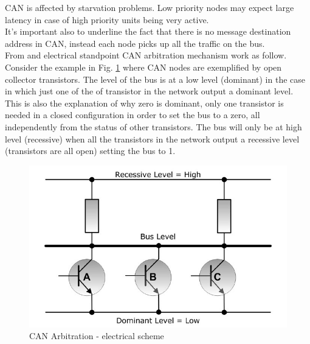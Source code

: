 \documentclass[../main.tex]{subfiles}
\begin{document}
\gls{CAN} is affected by starvation problems. Low priority nodes may expect large latency in case of high priority units being very active. \\
It's important also to underline the fact that there is no message destination address in \gls{CAN}, instead each node picks up all the traffic on the bus.\\
From and electrical standpoint \gls{CAN} arbitration mechanism work as follow. Consider the example in Fig. \ref{fig:CANABRELT} where \gls{CAN} nodes are exemplified by open collector transistors. 
The level of the bus is at a low level (dominant) in the case in which just one of the of transistor in the network output a dominant level. This is also the explanation of why zero is dominant, only one transistor is needed in a closed configuration in order to set the \gls{bus} to a zero, all independently from the status of other transistors. The \gls{bus} will only be at high level (recessive) when all the transistors in the network output a recessive level (transistors are all open) setting the \gls{bus} to 1.
\begin{figure}[ht]
    \centering
    \includegraphics[width=0.7\linewidth]{images_folder/controller-area-network-can-bus-bus-arbitration-3.jpg}
    \caption{CAN Arbitration -  electrical scheme}
    \label{fig:CANABRELT}
\end{figure}



\cleardoublepage
\end{document}
